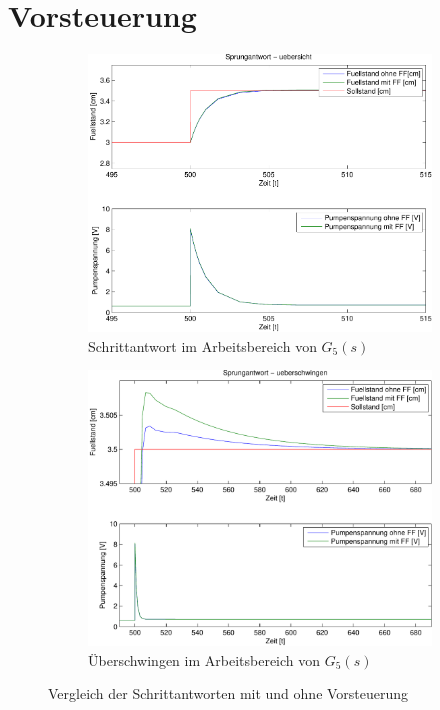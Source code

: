 \section{Vorsteuerung}

\begin{figure}[h!]
    \centering
    \begin{subfigure}{0.475\textwidth}
        \includegraphics[width=1.\textwidth]{13/L5_step_overview_plot.pdf}
        \caption{Schrittantwort im Arbeitsbereich von $G_5(s)$}
    \end{subfigure}
    \hfill{}
    \begin{subfigure}{0.475\textwidth}
        \includegraphics[width=1.\textwidth]{13/L5_step_overshoot_plot.pdf}
        \caption{Überschwingen im Arbeitsbereich von $G_5(s)$}
    \end{subfigure}
    \caption{Vergleich der Schrittantworten mit und ohne Vorsteuerung}
\end{figure}

